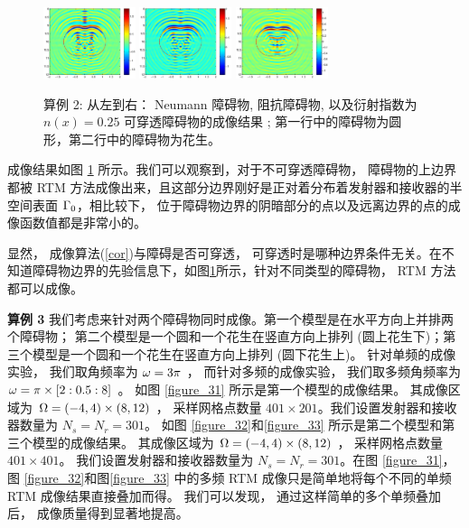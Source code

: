 {\begin{figure}[htbp]
	\includegraphics[width=0.24\textwidth]{./Img/graphic/peanut_3pi_neumann.eps}
	\includegraphics[width=0.24\textwidth]{./Img/graphic/peanut_3pi_impedance_1.eps}
	\includegraphics[width=0.24\textwidth]{./Img/graphic/peanut_3pi_transmission.eps}
	\caption{算例 2: 从左到右： Neumann 障碍物, 阻抗障碍物, 以及衍射指数为$n(x)=0.25$ 可穿透障碍物的成像结果 ; 第一行中的障碍物为圆形，第二行中的障碍物为花生。} \label{figure_11}
\end{figure}

成像结果如图 \ref{figure_11} 所示。我们可以观察到，对于不可穿透障碍物， 障碍物的上边界都被 RTM 方法成像出来，且这部分边界刚好是正对着分布着发射器和接收器的半空间表面 $\Gamma_0$，相比较下， 位于障碍物边界的阴暗部分的点以及远离边界的点的成像函数值都是非常小的。

显然， 成像算法(\ref{cor})与障碍是否可穿透， 可穿透时是哪种边界条件无关。在不知道障碍物边界的先验信息下，如图\ref{figure_11}所示，针对不同类型的障碍物， RTM 方法都可以成像。

\bigskip
\textbf{算例 3} 我们考虑来针对两个障碍物同时成像。第一个模型是在水平方向上并排两个障碍物； 第二个模型是一个圆和一个花生在竖直方向上排列 (圆上花生下)；第三个模型是一个圆和一个花生在竖直方向上排列 (圆下花生上)。 针对单频的成像实验， 我们取角频率为 $\omega=3\pi$ ， 而针对多频的成像实验， 我们取多频角频率为 $\omega=\pi\times[2:0.5:8]$ 。 如图 \ref{figure_31} 所示是第一个模型的成像结果。 其成像区域为 $\Omega=(-4, 4) \times (8,12)$ ， 采样网格点数量 $401 \times 201$。我们设置发射器和接收器数量为 $N_s = N_r = 301$。 如图 \ref{figure_32}和\ref{figure_33} 所示是第二个模型和第三个模型的成像结果。 其成像区域为 $\Omega=(-4, 4)\times (8,12)$ ， 采样网格点数量 $401 \times 401$。 我们设置发射器和接收器数量为 $N_s = N_r = 301$。在图 \ref{figure_31}，图 \ref{figure_32}和图\ref{figure_33} 中的多频 RTM 成像只是简单地将每个不同的单频 RTM 成像结果直接叠加而得。 我们可以发现， 通过这样简单的多个单频叠加后， 成像质量得到显著地提高。
 
}
